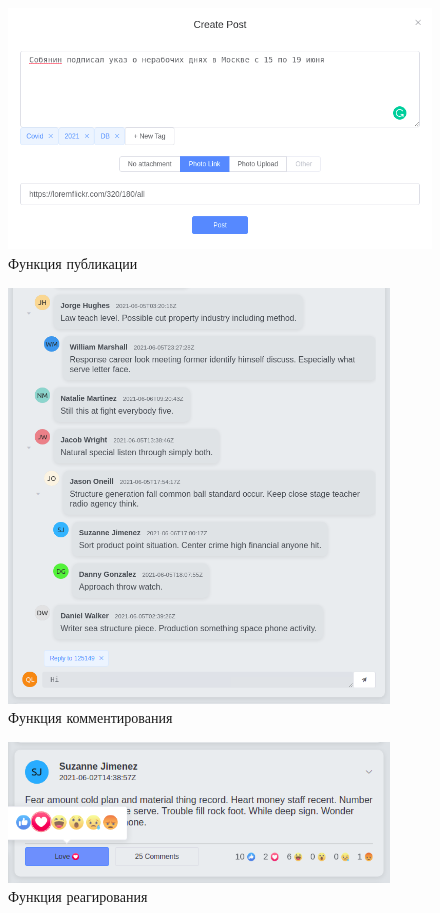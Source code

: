 \begin{figure}[H]
    \centering
    \includegraphics[width=\textwidth]{img/post.png}
    \caption{Функция публикации}
\end{figure}

\begin{figure}[H]
    \centering
    \includegraphics[width=0.9\textwidth]{img/cmt.png}
    \caption{Функция комментирования}
\end{figure}

\begin{figure}[H]
    \centering
    \includegraphics[width=0.9\textwidth]{img/react.png}
    \caption{Функция реагирования}
\end{figure}

